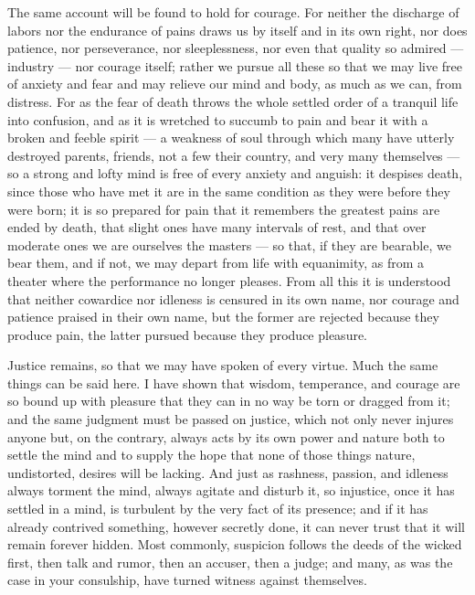  The same account will be found to hold for courage. For neither the discharge of labors nor the endurance of pains draws us by itself and in its own right, nor does patience, nor perseverance, nor sleeplessness, nor even that quality so admired — industry — nor courage itself; rather we pursue all these so that we may live free of anxiety and fear and may relieve our mind and body, as much as we can, from distress. For as the fear of death throws the whole settled order of a tranquil life into confusion, and as it is wretched to succumb to pain and bear it with a broken and feeble spirit — a weakness of soul through which many have utterly destroyed parents, friends, not a few their country, and very many themselves — so a strong and lofty mind is free of every anxiety and anguish: it despises death, since those who have met it are in the same condition as they were before they were born; it is so prepared for pain that it remembers the greatest pains are ended by death, that slight ones have many intervals of rest, and that over moderate ones we are ourselves the masters — so that, if they are bearable, we bear them, and if not, we may depart from life with equanimity, as from a theater where the performance no longer pleases. From all this it is understood that neither cowardice nor idleness is censured in its own name, nor courage and patience praised in their own name, but the former are rejected because they produce pain, the latter pursued because they produce pleasure.

 Justice remains, so that we may have spoken of every virtue. Much the same things can be said here. I have shown that wisdom, temperance, and courage are so bound up with pleasure that they can in no way be torn or dragged from it; and the same judgment must be passed on justice, which not only never injures anyone but, on the contrary, always acts by its own power and nature both to settle the mind and to supply the hope that none of those things nature, undistorted, desires will be lacking. And just as rashness, passion, and idleness always torment the mind, always agitate and disturb it, so injustice, once it has settled in a mind, is turbulent by the very fact of its presence; and if it has already contrived something, however secretly done, it can never trust that it will remain forever hidden. Most commonly, suspicion follows the deeds of the wicked first, then talk and rumor, then an accuser, then a judge; and many, as was the case in your consulship, have turned witness against themselves.

